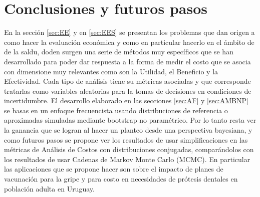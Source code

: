 \documentclass{siep}
\begin{document}
\section{Conclusiones y futuros pasos}
\label{sec:Conclu}

En la secci\'on  \ref{sec:EE}  y en \ref{sec:EES} se presentan los problemas que dan origen a como  hacer la evaluaci\'on econ\'omica  y como en particular hacerlo en el \'ambito de de la saldu, doden surgen una serie de m\'etodos muy espec\'ificos que se han desarrollado para poder dar respuesta a  la forma de medir el costo que se asocia con dimensione muy  relevantes como son la Utilidad, el Beneficio y la Efectividad. Cada tipo de an\'alisis  tiene su m\'etricas asociadas y que corresponde tratarlas como variables aleatorias para la tomas de decisiones en condiciones de incertidumbre. El desarrollo elaborado en las secciones \ref{sec:AF} y \ref{sec:AMBNP} se basas en un enfoque frecuencista usando distribuciones de referencia  o aproximadas simuladas mediante bootstrap no param\'etrico. Por lo tanto  resta ver la ganancia que se logran al hacer un planteo desde una perspectiva bayesiana, y como futuros pasos se propone ver los resultados de usar simplificaciones en las m\'etricas  de An\'alisis de Costos con distribuciones conjugadas, compar\'andolos con los resultados de usar Cadenas de Markov Monte Carlo (MCMC). En particular las aplicaciones que se propone hacer son sobre el impacto de planes de vacunaci\'on para la gripe y para costo  en necesidades de pr\'otesis dentales  en poblaci\'on adulta en Uruguay.











%
%
%

%








\end{document}
